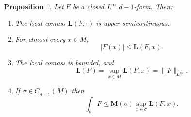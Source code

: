 \documentclass[reqno,11pt]{amsart}
\newcommand{\Chain}{\underline C}
\newcommand{\Mass}{\mathbf M}
\newcommand{\Comass}{\mathbf L}
\newtheorem{proposition}[theorem]{Proposition}
\theoremstyle{definition}
\numberwithin{equation}{section}
\begin{document}
\begin{proposition}\label{crandall}
Let $F$ be a closed $L^\infty$ $d - 1$-form. Then:
\begin{enumerate}
\item The local comass $\Comass(F, \cdot)$ is upper semicontinuous. \label{crandall usc}
\item For almost every $x \in M$, \label{crandall LDT}
$$|F(x)| \leq \Comass(F, x).$$
\item The local comass is bounded, and \label{crandall linfinity}
$$\Comass(F) = \sup_{x \in M} \Comass(F, x) = \|F\|_{L^\infty}.$$
\item If $\sigma \in \Chain_{d - 1}(M)$ then \label{crandall best curl is ABC}
$$\int_\sigma F \leq \Mass(\sigma) \sup_{x \in \sigma} \Comass(F, x).$$
\end{enumerate}
\end{proposition}
\end{document}
